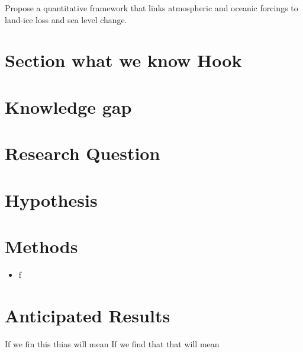 Propose a quantitative framework that links atmospheric and oceanic forcings to land-ice loss and sea level change.

\section{Section what we know Hook}

\section{Knowledge gap}
\section{Research Question}


\section{Hypothesis}

\section{Methods}

\begin{itemize}
    \item f
\end{itemize}

\section{Anticipated Results}

If we fin this thias will mean
If we find that that will mean